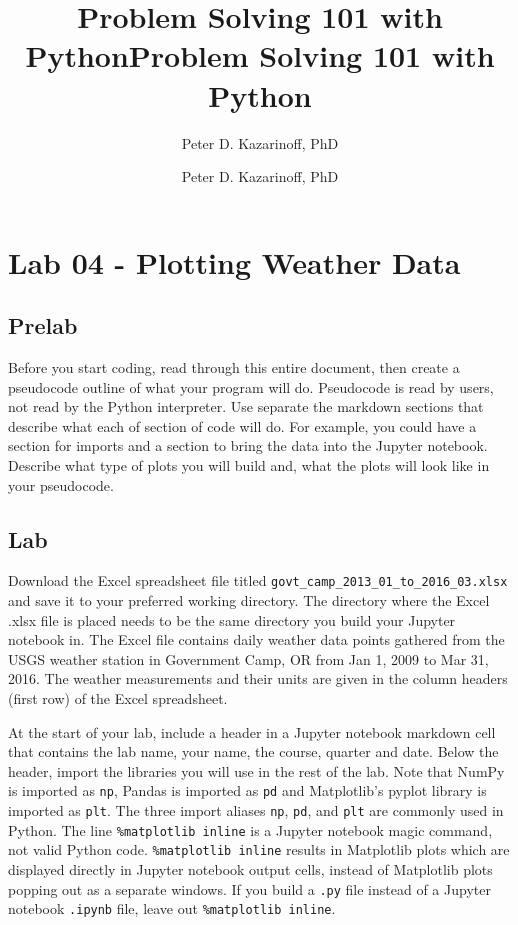 \documentclass[11pt]{article}
\title{Problem Solving 101 with Python}
\author{Peter D. Kazarinoff, PhD}
\date{}
\title{Problem Solving 101 with Python}
\author{Peter D. Kazarinoff, PhD}
\date{}
\begin{document}
    
    
    

    
    

    
    \hypertarget{lab-04---plotting-weather-data}{%
\section{Lab 04 - Plotting Weather
Data}\label{lab-04---plotting-weather-data}}

    \hypertarget{prelab}{%
\subsection{Prelab}\label{prelab}}

Before you start coding, read through this entire document, then create
a pseudocode outline of what your program will do. Pseudocode is read by
users, not read by the Python interpreter. Use separate the markdown
sections that describe what each of section of code will do. For
example, you could have a section for imports and a section to bring the
data into the Jupyter notebook. Describe what type of plots you will
build and, what the plots will look like in your pseudocode.

    \hypertarget{lab}{%
\subsection{Lab}\label{lab}}

Download the Excel spreadsheet file titled
\texttt{govt\_camp\_2013\_01\_to\_2016\_03.xlsx} and save it to your
preferred working directory. The directory where the Excel .xlsx file is
placed needs to be the same directory you build your Jupyter notebook
in. The Excel file contains daily weather data points gathered from the
USGS weather station in Government Camp, OR from Jan 1, 2009 to Mar 31,
2016. The weather measurements and their units are given in the column
headers (first row) of the Excel spreadsheet.

At the start of your lab, include a header in a Jupyter notebook
markdown cell that contains the lab name, your name, the course, quarter
and date. Below the header, import the libraries you will use in the
rest of the lab. Note that NumPy is imported as \texttt{np}, Pandas is
imported as \texttt{pd} and Matplotlib's pyplot library is imported as
\texttt{plt}. The three import aliases \texttt{np}, \texttt{pd}, and
\texttt{plt} are commonly used in Python. The line
\texttt{\%matplotlib\ inline} is a Jupyter notebook magic command, not
valid Python code. \texttt{\%matplotlib\ inline} results in Matplotlib
plots which are displayed directly in Jupyter notebook output cells,
instead of Matplotlib plots popping out as a separate windows. If you
build a \texttt{.py} file instead of a Jupyter notebook \texttt{.ipynb}
file, leave out \texttt{\%matplotlib\ inline}.
\end{document}
